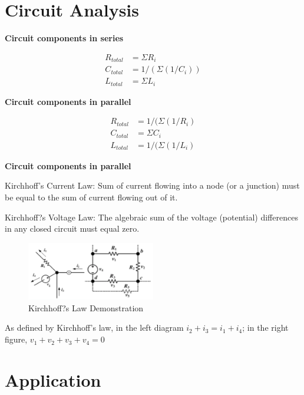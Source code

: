\documentclass{article}
\begin{document}
\section{Circuit Analysis}

\textbf{\large{Circuit components in series}}\par

\begin{equation}
\begin{split}
	R_{total} & = \Sigma R_i\\
	C_{total} & = 1/(\Sigma(1/C_i))\\
	L_{total} & = \Sigma L_i
\end{split}
\end{equation}

\textbf{\large{Circuit components in parallel}}\par

\begin{equation}
\begin{split}
	R_{total} & = 1/(\Sigma (1/R_i)\\
	C_{total} & = \Sigma C_i\\
	L_{total} & = 1/(\Sigma (1/L_i)
\end{split}
\end{equation}

\textbf{\large{Circuit components in parallel}}\par

Kirchhoff's Current Law: Sum of current flowing into a node (or a junction) must be equal to the sum of current flowing out of it. \par
Kirchhoff?s Voltage Law: The algebraic sum of the voltage (potential) differences in any closed circuit must equal zero.

\begin{figure}[!h]
	\center
	\includegraphics[width=0.5\textwidth, keepaspectratio]{kirchof_demo}
	\caption{Kirchhoff?s Law Demonstration}
	\label{fig:kirchof_demo}
\end{figure}
As defined by Kirchhoff's law, in the left diagram $i_2+i_3=i_1+i_4$; in the right figure, $v_1+v_2+v_3+v_4=0$

\section{Application}
\end{document}
